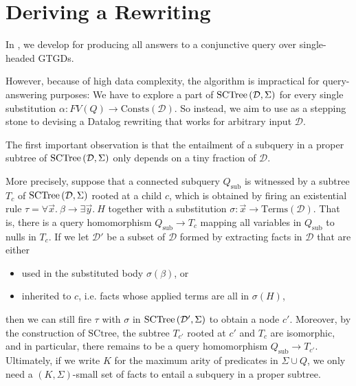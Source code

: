 \documentclass[12pt]{report}
\theoremstyle{plain}
\theoremstyle{definition}
\def\Consts{{\mathrm{Consts}}}
\def\Terms{{\mathrm{Terms}}}
\newcommand{\SCTree}[2]{\ensuremath{\normalfont{\textrm{SCTree}} \left( #1, #2 \right)}}
\begin{document}
\newpage
\chapter{Deriving a Rewriting}\label{deriving-a-rewriting}

In , we develop  for producing all answers to a conjunctive query over single-headed GTGDs.

However, because of high data complexity, the algorithm is impractical for query-answering purposes: We have to explore a part of $\SCTree{\mathcal{D}}{\Sigma}$ for every single substitution $\alpha: FV(Q) \rightarrow \Consts(\mathcal{D})$. So instead, we aim to use  as a stepping stone to devising a Datalog rewriting that works for arbitrary input $\mathcal{D}$.

The first important observation is that the entailment of a subquery in a proper subtree of $\SCTree{\mathcal{D}}{\Sigma}$ only depends on a tiny fraction of $\mathcal{D}$.

More precisely, suppose that a connected subquery $Q_\mathrm{sub}$ is witnessed by a subtree $T_c$ of $\SCTree{\mathcal{D}}{\Sigma}$ rooted at a child $c$, which is obtained by firing an existential rule $\tau = \forall \vec{x}.\ \beta \rightarrow \exists \vec{y}.\ H$ together with a substitution $\sigma: \vec{x} \rightarrow \Terms(\mathcal{D})$. That is, there is a query homomorphism $Q_\mathrm{sub} \rightarrow T_c$ mapping all variables in $Q_\mathrm{sub}$ to nulls in $T_c$. If we let $\mathcal{D'}$ be a subset of $\mathcal{D}$ formed by extracting facts in $\mathcal{D}$ that are either
\begin{itemize}
  \item used in the substituted body $\sigma(\beta)$, or
  \item inherited to $c$, i.e. facts whose applied terms are all in $\sigma(H)$,
\end{itemize}
then we can still fire $\tau$ with $\sigma$ in $\SCTree{\mathcal{D'}}{\Sigma}$ to obtain a node $c'$. Moreover, by the construction of $\mathrm{SCtree}$, the subtree $T_{c'}$ rooted at $c'$ and $T_c$ are isomorphic, and in particular, there remains to be a query homomorphism $Q_\mathrm{sub} \rightarrow T_{c'}$. Ultimately, if we write $K$ for the maximum arity of predicates in $\Sigma \cup Q$, we only need a $(K, \Sigma)$-small set of facts to entail a subquery in a proper subtree.
\end{document}
